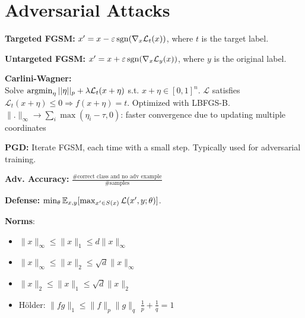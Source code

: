 \section{Adversarial Attacks}
\textbf{Targeted FGSM:} $x^\prime = x - \varepsilon \operatorname{\operatorname{sgn}}(\nabla_x \mathcal{L}_t(x))$, where $t$ is the target label.

\textbf{Untargeted FGSM:} $x^\prime = x + \varepsilon \operatorname{\operatorname{sgn}}(\nabla_x \mathcal{L}_y (x))$, where $y$ is the original label.

\textbf{Carlini-Wagner:}\\
Solve $\operatorname{\operatorname{argmin}}_\eta ||\eta||_p+\lambda \mathcal{L}_t(x+\eta)$ s.t. $x+\eta\in [0,1]^n$. $\mathcal{L}$ satisfies $\mathcal{L}_t(x+\eta)\le 0 \Rightarrow f(x+\eta)=t$. Optimized with LBFGS-B.\\
$\|.\|_{\infty}\rightarrow\sum_i \max(\eta_i-\tau,0)$: faster convergence due to updating multiple coordinates

\textbf{PGD:} Iterate FGSM, each time with a small step. Typically used for adversarial training.

\textbf{Adv. Accuracy:} $\frac{\#\text{correct class and no adv example}}{\#\text{samples}}$

\textbf{Defense:} $\min_\theta \mathbb{E}_{x,y} [\max_{x^\prime\in S(x)} \mathcal{L}(x^\prime, y; \theta)]$.

\textbf{Norms}:
\begin{itemize}
    \item[] $\|x\|_\infty\leq\|x\|_1\leq d\|x\|_\infty$
    \item[] $\|x\|_\infty\leq\|x\|_2\leq\sqrt{d}\|x\|_\infty$
    \item[] $\|x\|_2\leq\|x\|_1\leq\sqrt{d}\|x\|_2$
    \item[] Hölder: $\|fg\|_1\leq\|f\|_p\|g\|_q$  $\frac{1}{p}+\frac{1}{q}=1$
\end{itemize}
